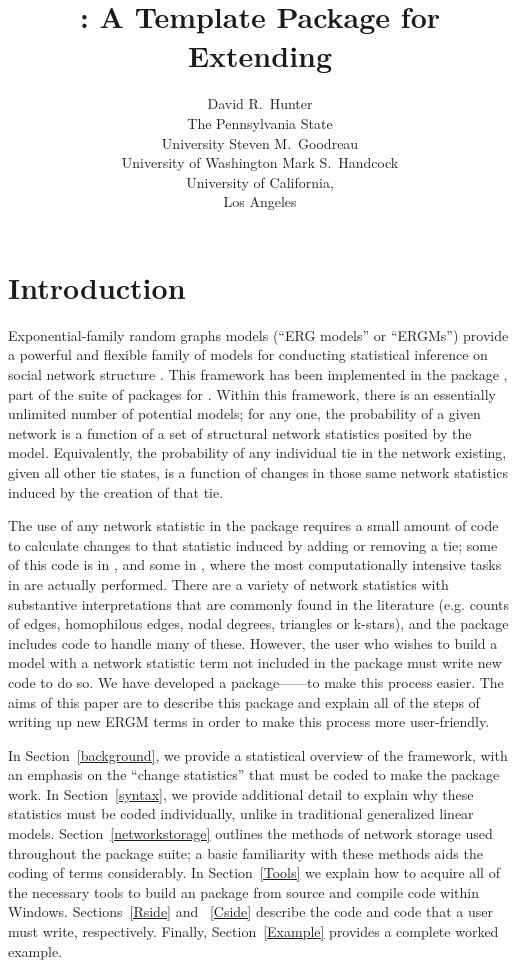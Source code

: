 \documentclass[nojss]{jss}
\title{\pkg{ergm.userterms}: A Template Package for Extending 
\pkg{statnet}}
\author{
  David R.\ Hunter \\ The Pennsylvania State\\University \And
  Steven M.\ Goodreau \\ University of Washington \And
  Mark S.\ Handcock \\ University of California,\\Los Angeles
}
\begin{document}
\section{Introduction}
\label{introduction}

Exponential-family random graphs models (``ERG models'' or ``ERGMs'') provide a
powerful and flexible family of models for conducting statistical inference on
social network structure \citep{fra86, statnetjss,ergmjss, statnettutorialjss}.
This framework has been implemented in the  package \citep{ergmjss},
part of the  suite of packages \citep{statnetjss} for 
\citep{r2010}. Within this framework, there is an essentially unlimited number
of potential models; for any one, the probability of a given network is a
function of a set of structural network statistics posited by the model.
Equivalently, the probability of any individual tie in the network existing,
given all other tie states, is a function of changes in those same network
statistics induced by the creation of that tie.

The use of any network statistic in the  package requires a small
amount of code to calculate changes to that statistic induced by adding or
removing a tie; some of this code is in , and some in ,
where the most computationally intensive tasks in  are actually
performed. There are a variety of network statistics with substantive
interpretations that are commonly found in the literature (e.g. counts of edges,
homophilous edges, nodal degrees, triangles or k-stars), and the 
package includes code to handle many of these. However, the user who wishes to
build a model with a network statistic term not included in the  package 
must write new code to do so. We have developed a 
package------to make this process easier. 
The aims of this paper are
to describe this package and explain all of the steps of writing up new ERGM
terms in order to make this process more user-friendly.

In Section~\ref{background}, we provide a statistical overview of the 
framework, with an emphasis on the ``change statistics'' that must be coded to
make the  package work. In Section~\ref{syntax}, we provide additional
detail to explain why these statistics must be coded individually, unlike in
traditional generalized linear models. Section~\ref{networkstorage} outlines the
methods of network storage used throughout the  package suite; a
basic familiarity with these methods aids the coding of  terms
considerably. In Section~\ref{Tools} we explain how to acquire all of the
necessary tools to build an  package from source and compile
 code within Windows. Sections~\ref{Rside} and ~\ref{Cside} describe
the  code and  code that a user must write,
respectively. Finally, Section~\ref{Example} provides a complete worked example.
\end{document}
